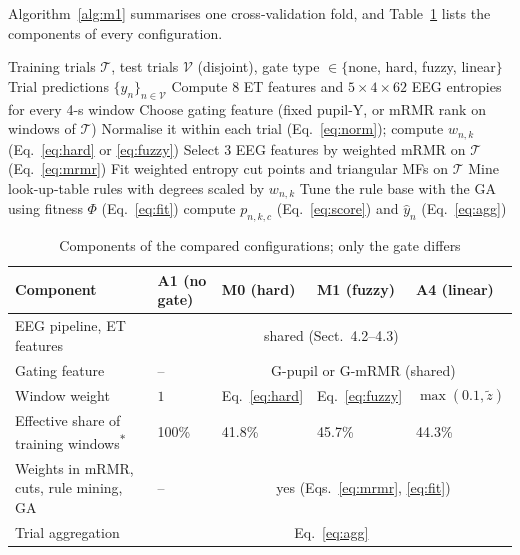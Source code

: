 \documentclass[11pt,a4paper]{article}
\newcommand{\simnote}{\textsuperscript{$\ast$}}
\begin{document}
Algorithm~\ref{alg:m1} summarises one cross-validation fold, and Table~\ref{tab:m0m1} lists the components of every configuration.

\begin{algorithm}[t]
\caption{Gated S-FIS-GA recognition for one cross-validation fold}\label{alg:m1}
\small
\begin{algorithmic}[1]
\Require Training trials $\mathcal{T}$, test trials $\mathcal{V}$ (disjoint), gate type $\in\{$none, hard, fuzzy, linear$\}$
\Ensure Trial predictions $\{\hat y_n\}_{n\in\mathcal{V}}$
\State Compute 8 ET features and $5\times4\times62$ EEG entropies for every 4-s window
\State Choose gating feature (fixed pupil-Y, or mRMR rank on windows of $\mathcal{T}$)
\State Normalise it within each trial (Eq.~\ref{eq:norm}); compute $w_{n,k}$ (Eq.~\ref{eq:hard} or \ref{eq:fuzzy})
  \State Select 3 EEG features by weighted mRMR on $\mathcal{T}$ (Eq.~\ref{eq:mrmr})
  \State Fit weighted entropy cut points and triangular MFs on $\mathcal{T}$
  \State Mine look-up-table rules with degrees scaled by $w_{n,k}$
  \State Tune the rule base with the GA using fitness $\Phi$ (Eq.~\ref{eq:fit})
   compute $p_{n,k,c}$ (Eq.~\ref{eq:score}) and $\hat y_n$ (Eq.~\ref{eq:agg}) \EndFor
\EndFor
\end{algorithmic}
\end{algorithm}

\begin{table}[t]
\centering\small
\caption{Components of the compared configurations; only the gate differs}\label{tab:m0m1}
\begin{tabular}{@{}lllll@{}}
\toprule
Component & A1 (no gate) & M0 (hard) & M1 (fuzzy) & A4 (linear)\\
\midrule
EEG pipeline, ET features & \multicolumn{4}{c}{shared (Sect.~4.2--4.3)}\\
Gating feature & -- & \multicolumn{3}{c}{G-pupil or G-mRMR (shared)}\\
Window weight & $1$ & Eq.~\eqref{eq:hard} & Eq.~\eqref{eq:fuzzy} & $\max(0.1,\tilde z)$\\
Effective share of training windows\simnote & 100\% & 41.8\% & 45.7\% & 44.3\%\\
Weights in mRMR, cuts, rule mining, GA & -- & \multicolumn{3}{c}{yes (Eqs.~\ref{eq:mrmr}, \ref{eq:fit})}\\
Trial aggregation & \multicolumn{4}{c}{Eq.~\eqref{eq:agg}}\\
\bottomrule
\end{tabular}
\end{table}
\end{document}
